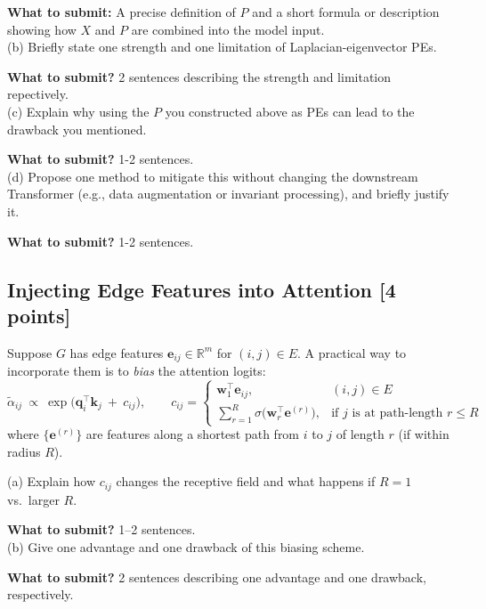 \textbf{What to submit:} A precise definition of $P$ and a short formula or description showing how $X$ and $P$ are combined into the model input.\\

(b) Briefly state one strength and one limitation of Laplacian-eigenvector PEs.

\textbf{What to submit?}  2 sentences describing the strength and limitation repectively. \\

(c) Explain why using the $P$ you constructed above as PEs can lead to the drawback you mentioned.

\textbf{What to submit?}  1-2 sentences. \\

(d) Propose one method to mitigate this without changing the downstream Transformer (e.g., data augmentation or invariant processing), and briefly justify it.

\textbf{What to submit?}  1-2 sentences.

\Solution{
}

\subsection{Injecting Edge Features into Attention [4 points]}
Suppose $G$ has edge features $\mathbf{e}_{ij}\in\mathbb{R}^{m}$ for $(i,j)\in E$. A practical way to incorporate them is to \emph{bias} the attention logits:
\[
\tilde{\alpha}_{ij}\ \propto\ \exp\!\Big(\mathbf{q}_i^\top\mathbf{k}_j\ +\ c_{ij}\Big),
\qquad c_{ij}= 
\begin{cases}
\mathbf{w}_1^\top \mathbf{e}_{ij}, & (i,j)\in E\\[2pt]
\sum_{r=1}^{R}\sigma\!\big(\mathbf{w}_r^\top \mathbf{e}^{(r)}\big), & \text{if } j \text{ is at path-length } r\le R
\end{cases}
\]
where $\{\mathbf{e}^{(r)}\}$ are features along a shortest path from $i$ to $j$ of length $r$ (if within radius $R$).

(a) Explain how $c_{ij}$ changes the receptive field and what happens if $R=1$ vs.\ larger $R$.

\textbf{What to submit?} 1--2 sentences. \\

(b) Give one advantage and one drawback of this biasing scheme.

\textbf{What to submit?} 2 sentences describing one advantage and one drawback, respectively.

\Solution{
}

